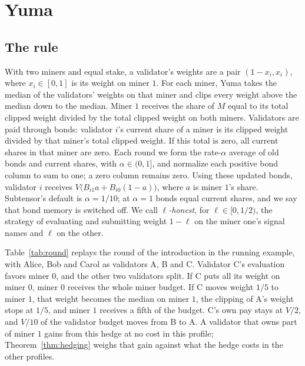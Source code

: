 \documentclass[sigconf,anonymous,review]{acmart}
\numberwithin{equation}{section}
\begin{document}
\section{Yuma}
\label{sec:yuma}

\subsection{The rule}

With two miners and equal stake, a validator's weights are a pair
$(1-x_i,x_i)$, where $x_i\in[0,1]$ is its weight on miner $1$. For each miner,
Yuma takes the median of the validators' weights on that miner and clips every
weight above the median down to the median. Miner $1$ receives the share of $M$
equal to its total clipped weight divided by the total clipped weight on both
miners. Validators are paid through bonds: validator $i$'s current share of a
miner is its clipped weight divided by that miner's total clipped weight.
If this total is zero, all current shares in that miner are zero. Each round
we form the rate-$\alpha$ average of old bonds and current shares, with
$\alpha\in(0,1]$, and normalize each positive bond column to sum to one; a zero
column remains zero. Using these updated bonds, validator $i$ receives
$V\bigl(B_{i1}a+B_{i0}(1-a)\bigr)$, where $a$ is miner $1$'s share. Subtensor's
default is $\alpha=1/10$; at $\alpha=1$ bonds equal current shares, and we say
that bond memory is switched off. We call \emph{$\ell$-honest}, for
$\ell\in[0,1/2)$, the strategy of evaluating and submitting weight $1-\ell$ on
the miner one's signal names and $\ell$ on the other.

Table~\ref{tab:round} replays the round of the introduction in the running
example, with Alice, Bob and Carol as validators A, B and C.
Validator C's evaluation favors miner $0$, and the other two validators split.
If C puts all its weight on miner $0$, miner $0$ receives the whole miner
budget. If C moves weight $1/5$ to miner $1$, that weight becomes the median on
miner $1$, the clipping of A's weight stops at $1/5$, and miner $1$ receives a
fifth of the budget. C's own pay stays at $V/2$, and $V/10$ of the validator
budget moves from B to A. A validator that owns part of miner $1$ gains from
this hedge at no cost in this profile; Theorem~\ref{thm:hedging} weighs that
gain against what the hedge costs in the other profiles.
\end{document}
